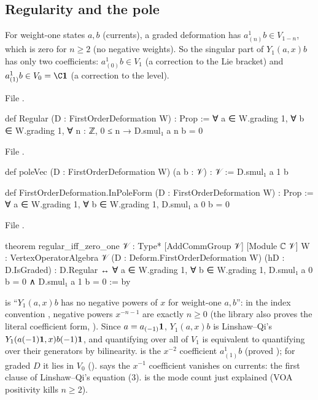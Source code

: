 \subsection{Regularity and the pole}

For weight-one states $a,b$ (currents), a graded deformation has
$a^1_{(n)}b\in V_{1-n}$, which is zero for $n\ge2$ (no negative weights). So the singular part of
$Y_1(a,x)b$ has only two coefficients: $a^1_{(0)}b\in V_1$ (a correction to the Lie bracket) and
$a^1_{(1)}b\in V_0 = \C\lnineone$ (a correction to the level).

\noindent File .
\begin{leancode}
def Regular (D : FirstOrderDeformation W) : Prop :=
  ∀ a ∈ W.grading 1, ∀ b ∈ W.grading 1, ∀ n : ℤ, 0 ≤ n → D.smul₁ a n b = 0
\end{leancode}
\noindent File .
\begin{leancode}
def poleVec (D : FirstOrderDeformation W) (a b : 𝒱) : 𝒱 := D.smul₁ a 1 b
\end{leancode}
\begin{leancode}
def FirstOrderDeformation.InPoleForm (D : FirstOrderDeformation W) : Prop :=
  ∀ a ∈ W.grading 1, ∀ b ∈ W.grading 1, D.smul₁ a 0 b = 0
\end{leancode}
\noindent File .
\begin{leancode}
theorem regular_iff_zero_one {𝒱 : Type*} [AddCommGroup 𝒱] [Module ℂ 𝒱]
    {W : VertexOperatorAlgebra 𝒱} (D : Deform.FirstOrderDeformation W) (hD : D.IsGraded) :
    D.Regular ↔ ∀ a ∈ W.grading 1, ∀ b ∈ W.grading 1,
      D.smul₁ a 0 b = 0 ∧ D.smul₁ a 1 b = 0 := by
\end{leancode}

\begin{dictionary}
 is ``$Y_1(a,x)b$ has no negative powers of $x$ for weight-one $a,b$'': in the
index convention , negative powers $x^{-n-1}$ are exactly $n\ge0$ (the
library also proves the literal coefficient form, ). Since $a = a_{(-1)}\mathbf{1}$,
$Y_1(a,x)b$ is Linshaw--Qi's $Y_1(a(-1)\mathbf{1},x)b(-1)\mathbf{1}$, and quantifying over all of $V_1$
is equivalent to quantifying over their generators by bilinearity.  is the
$x^{-2}$ coefficient $a^1_{(1)}b$ (proved ); for graded $D$ it lies in
$V_0$ ().  says the $x^{-1}$ coefficient vanishes on
currents: the first clause of Linshaw--Qi's equation (3).  is the
mode count just explained (VOA positivity kills $n\ge2$).
\end{dictionary}

